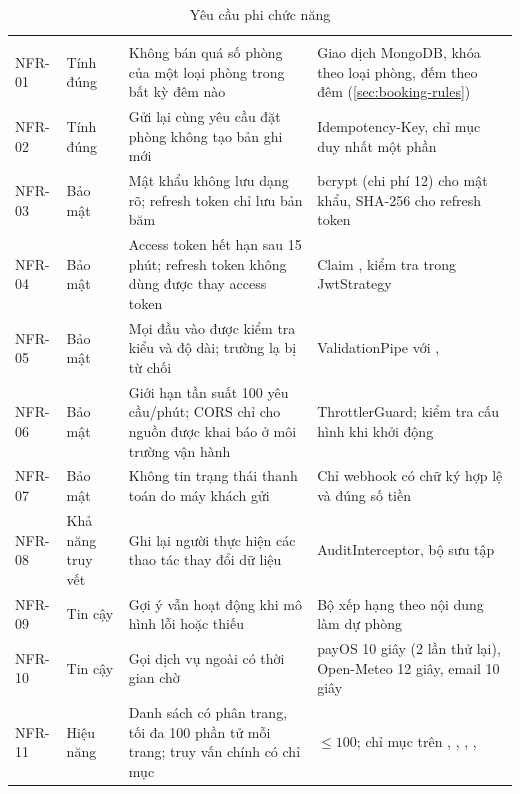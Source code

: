 \begin{rtable}
\begin{longtable}{|C{1.4cm}|L{2.6cm}|L{5.6cm}|L{5.0cm}|}
\caption{Yêu cầu phi chức năng}\label{tab:nfr}\\
\hline
{} &  &  &  \\ \hline
\endfirsthead
\hline
{} &  &  &  \\ \hline
\endhead
NFR-01 & Tính đúng & Không bán quá số phòng của một loại phòng trong bất kỳ đêm nào & Giao dịch MongoDB, khóa theo loại phòng, đếm theo đêm (\cref{sec:booking-rules}) \\ \hline
NFR-02 & Tính đúng & Gửi lại cùng yêu cầu đặt phòng không tạo bản ghi mới & Idempotency-Key, chỉ mục duy nhất một phần \\ \hline
NFR-03 & Bảo mật & Mật khẩu không lưu dạng rõ; refresh token chỉ lưu bản băm & bcrypt (chi phí 12) cho mật khẩu, SHA-256 cho refresh token \\ \hline
NFR-04 & Bảo mật & Access token hết hạn sau 15 phút; refresh token không dùng được thay access token & Claim , kiểm tra trong JwtStrategy \\ \hline
NFR-05 & Bảo mật & Mọi đầu vào được kiểm tra kiểu và độ dài; trường lạ bị từ chối & ValidationPipe với ,  \\ \hline
NFR-06 & Bảo mật & Giới hạn tần suất 100 yêu cầu/phút; CORS chỉ cho nguồn được khai báo ở môi trường vận hành & ThrottlerGuard; kiểm tra cấu hình khi khởi động \\ \hline
NFR-07 & Bảo mật & Không tin trạng thái thanh toán do máy khách gửi & Chỉ webhook có chữ ký hợp lệ và đúng số tiền \\ \hline
NFR-08 & Khả năng truy vết & Ghi lại người thực hiện các thao tác thay đổi dữ liệu & AuditInterceptor, bộ sưu tập  \\ \hline
NFR-09 & Tin cậy & Gợi ý vẫn hoạt động khi mô hình lỗi hoặc thiếu & Bộ xếp hạng theo nội dung làm dự phòng \\ \hline
NFR-10 & Tin cậy & Gọi dịch vụ ngoài có thời gian chờ & payOS 10 giây (2 lần thử lại), Open-Meteo 12 giây, email 10 giây \\ \hline
NFR-11 & Hiệu năng & Danh sách có phân trang, tối đa 100 phần tử mỗi trang; truy vấn chính có chỉ mục &  $\le 100$; chỉ mục trên , , , ,  \\ \hline

\end{longtable}
\end{rtable}
